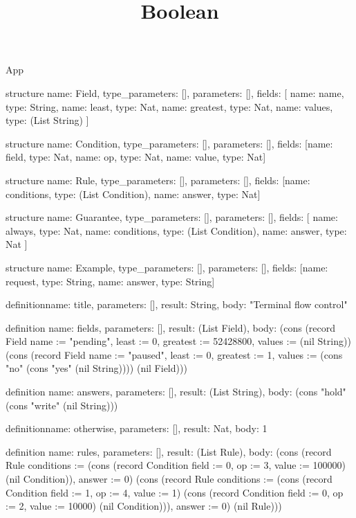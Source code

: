 \begin{lexlean}{App}
\title{Boolean}
\begin{semanticmodule}
structure{
  name: Field,
  type_parameters: [],
  parameters: [],
  fields: [
    {name: name, type: String},
    {name: least, type: Nat},
    {name: greatest, type: Nat},
    {name: values, type: (List String)}
  ]
}

structure{
  name: Condition,
  type_parameters: [],
  parameters: [],
  fields: [{name: field, type: Nat}, {name: op, type: Nat}, {name: value, type: Nat}]
}

structure{
  name: Rule,
  type_parameters: [],
  parameters: [],
  fields: [{name: conditions, type: (List Condition)}, {name: answer, type: Nat}]
}

structure{
  name: Guarantee,
  type_parameters: [],
  parameters: [],
  fields: [
    {name: always, type: Nat},
    {name: conditions, type: (List Condition)},
    {name: answer, type: Nat}
  ]
}

structure{
  name: Example,
  type_parameters: [],
  parameters: [],
  fields: [{name: request, type: String}, {name: answer, type: String}]
}

definition{name: title, parameters: [], result: String, body: "Terminal flow control"}

definition{
  name: fields,
  parameters: [],
  result: (List Field),
  body: (cons (record Field {name := "pending", least := 0, greatest := 52428800, values := (nil String)}) (cons (record Field {name := "paused", least := 0, greatest := 1, values := (cons "no" (cons "yes" (nil String)))}) (nil Field)))
}

definition{
  name: answers,
  parameters: [],
  result: (List String),
  body: (cons "hold" (cons "write" (nil String)))
}

definition{name: otherwise, parameters: [], result: Nat, body: 1}

definition{
  name: rules,
  parameters: [],
  result: (List Rule),
  body: (cons (record Rule {conditions := (cons (record Condition {field := 0, op := 3, value := 100000}) (nil Condition)), answer := 0}) (cons (record Rule {conditions := (cons (record Condition {field := 1, op := 4, value := 1}) (cons (record Condition {field := 0, op := 2, value := 10000}) (nil Condition))), answer := 0}) (nil Rule)))
}


\end{semanticmodule}
\end{lexlean}
